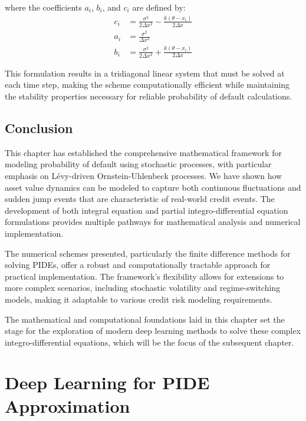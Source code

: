\documentclass[11pt,twoside,openright]{report}
\begin{document}
where the coefficients $a_i$, $b_i$, and $c_i$ are defined by:
\begin{align}
c_i &= \frac{\sigma^2}{2\Delta x^2} - \frac{k(\theta - x_i)}{2\Delta x} \\
a_i &= \frac{\sigma^2}{\Delta x^2} \\
b_i &= \frac{\sigma^2}{2\Delta x^2} + \frac{k(\theta - x_i)}{2\Delta x}
\end{align}

This formulation results in a tridiagonal linear system that must be solved at each time step, making the scheme computationally efficient while maintaining the stability properties necessary for reliable probability of default calculations.

\section{Conclusion}
\label{sec:conclusion_chapter2}

This chapter has established the comprehensive mathematical framework for modeling probability of default using stochastic processes, with particular emphasis on Lévy-driven Ornstein-Uhlenbeck processes. We have shown how asset value dynamics can be modeled to capture both continuous fluctuations and sudden jump events that are characteristic of real-world credit events. The development of both integral equation and partial integro-differential equation formulations provides multiple pathways for mathematical analysis and numerical implementation.

The numerical schemes presented, particularly the finite difference methods for solving PIDEs, offer a robust and computationally tractable approach for practical implementation. The framework's flexibility allows for extensions to more complex scenarios, including stochastic volatility and regime-switching models, making it adaptable to various credit risk modeling requirements.

The mathematical and computational foundations laid in this chapter set the stage for the exploration of modern deep learning methods to solve these complex integro-differential equations, which will be the focus of the subsequent chapter.

\chapter{Deep Learning for PIDE Approximation}
\label{ch:deep_learning_for_pide_approximation}
\end{document}
